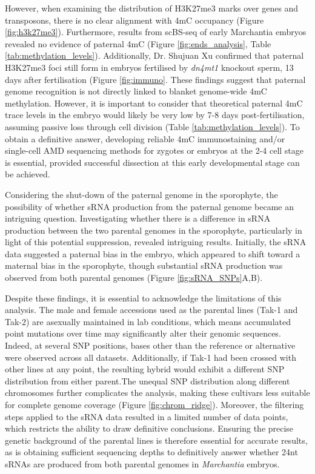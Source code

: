 However, when examining the distribution of H3K27me3 marks over genes and transposons, there is no clear alignment with 4mC occupancy (Figure \ref{fig:h3k27me3}). Furthermore, results from scBS-seq of early Marchantia embryos revealed no evidence of paternal 4mC (Figure \ref{fig:ends_analysis}, Table \ref{tab:methylation_levels}). Additionally, Dr. Shujuan Xu confirmed that paternal H3K27me3 foci still form in embryos fertilised by \textit{dn4mt1} knockout sperm, 13 days after fertilisation (Figure \ref{fig:immuno}. These findings suggest that paternal genome recognition is not directly linked to blanket genome-wide 4mC methylation. However, it is important to consider that theoretical paternal 4mC trace levels in the embryo would likely be very low by 7-8 days post-fertilisation, assuming passive loss through cell division (Table \ref{tab:methylation_levels}). To obtain a definitive answer,  developing reliable 4mC immunostaining and/or single-cell AMD sequencing methods for zygotes or embryos at the 2-4 cell stage is essential, provided successful dissection at this early developmental stage can be achieved.

 Considering the shut-down of the paternal genome in the sporophyte, the possibility of whether sRNA production from the paternal genome became an intriguing question. Investigating whether there is a difference in sRNA production between the two parental genomes in the sporophyte, particularly in light of this potential suppression, revealed intriguing results. Initially, the sRNA data suggested a paternal bias in the embryo, which appeared to shift toward a maternal bias in the sporophyte, though substantial sRNA production was observed from both parental genomes (Figure \ref{fig:sRNA_SNPs}A,B). 
 
 Despite these findings, it is essential to acknowledge the limitations of this analysis. The male and female accessions used as the parental lines (Tak-1 and Tak-2) are asexually maintained in lab conditions, which means accumulated point mutations over time may significantly alter their genomic sequences. Indeed, at several SNP positions, bases other than the reference or alternative were observed across all datasets. Additionally, if Tak-1 had been crossed with other lines at any point, the resulting hybrid would exhibit a different SNP distribution from either parent.The unequal SNP distribution along different chromosomes further complicates the analysis, making these cultivars less suitable for complete genome coverage (Figure \ref{fig:chrom_ridge}). Moreover, the filtering steps applied to the sRNA data resulted in a limited number of data points, which restricts the ability to draw definitive conclusions. Ensuring the precise genetic background of the parental lines is therefore essential for accurate results, as is obtaining sufficient sequencing depths to definitively answer whether 24nt sRNAs are produced from both parental genomes in \textit{Marchantia} embryos. 
 
